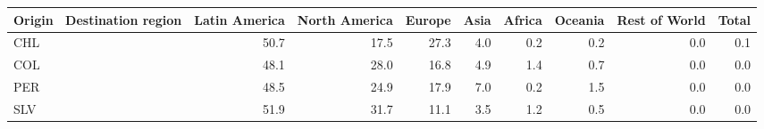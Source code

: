 \begin{tabular}{lrrrrrrrr}
\toprule
Origin \ Destination region & Latin America & North America & Europe & Asia & Africa & Oceania & Rest of World & Total \\
\midrule
CHL & 50.7 & 17.5 & 27.3 & 4.0 & 0.2 & 0.2 & 0.0 & 0.1 \\
COL & 48.1 & 28.0 & 16.8 & 4.9 & 1.4 & 0.7 & 0.0 & 0.0 \\
PER & 48.5 & 24.9 & 17.9 & 7.0 & 0.2 & 1.5 & 0.0 & 0.0 \\
SLV & 51.9 & 31.7 & 11.1 & 3.5 & 1.2 & 0.5 & 0.0 & 0.0 \\
\bottomrule
\end{tabular}
